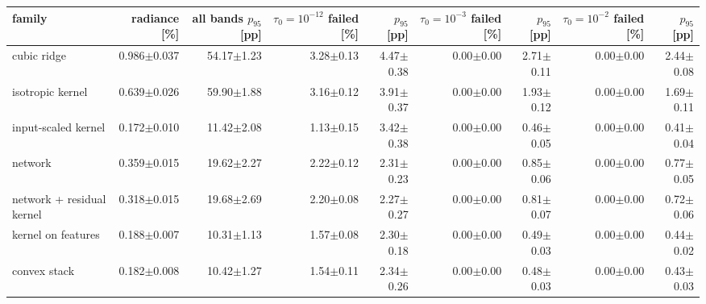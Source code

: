 \begin{tabular}{lrrrrrrrr}
\toprule
family & radiance [\%] & \thead{all bands\\$p_{95}$ [pp]} & \thead{$\tau_0=10^{-12}$\\failed [\%]} & $p_{95}$ [pp] & \thead{$\tau_0=10^{-3}$\\failed [\%]} & $p_{95}$ [pp] & \thead{$\tau_0=10^{-2}$\\failed [\%]} & $p_{95}$ [pp] \\
\midrule
cubic ridge & 0.986$\pm$0.037 & 54.17$\pm$1.23 & 3.28$\pm$0.13 & 4.47$\pm$0.38 & 0.00$\pm$0.00 & 2.71$\pm$0.11 & 0.00$\pm$0.00 & 2.44$\pm$0.08 \\
isotropic kernel & 0.639$\pm$0.026 & 59.90$\pm$1.88 & 3.16$\pm$0.12 & 3.91$\pm$0.37 & 0.00$\pm$0.00 & 1.93$\pm$0.12 & 0.00$\pm$0.00 & 1.69$\pm$0.11 \\
input-scaled kernel & 0.172$\pm$0.010 & 11.42$\pm$2.08 & 1.13$\pm$0.15 & 3.42$\pm$0.38 & 0.00$\pm$0.00 & 0.46$\pm$0.05 & 0.00$\pm$0.00 & 0.41$\pm$0.04 \\
network & 0.359$\pm$0.015 & 19.62$\pm$2.27 & 2.22$\pm$0.12 & 2.31$\pm$0.23 & 0.00$\pm$0.00 & 0.85$\pm$0.06 & 0.00$\pm$0.00 & 0.77$\pm$0.05 \\
network + residual kernel & 0.318$\pm$0.015 & 19.68$\pm$2.69 & 2.20$\pm$0.08 & 2.27$\pm$0.27 & 0.00$\pm$0.00 & 0.81$\pm$0.07 & 0.00$\pm$0.00 & 0.72$\pm$0.06 \\
kernel on features & 0.188$\pm$0.007 & 10.31$\pm$1.13 & 1.57$\pm$0.08 & 2.30$\pm$0.18 & 0.00$\pm$0.00 & 0.49$\pm$0.03 & 0.00$\pm$0.00 & 0.44$\pm$0.02 \\
convex stack & 0.182$\pm$0.008 & 10.42$\pm$1.27 & 1.54$\pm$0.11 & 2.34$\pm$0.26 & 0.00$\pm$0.00 & 0.48$\pm$0.03 & 0.00$\pm$0.00 & 0.43$\pm$0.03 \\
\bottomrule
\end{tabular}
